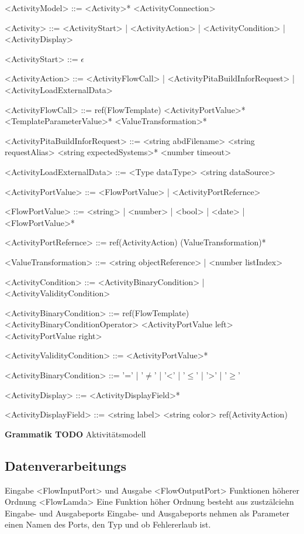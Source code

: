\documentclass{article}
\begin{document}
    \begin{grammar}
        <ActivityModel> ::= <Activity>* <ActivityConnection>

        <Activity> ::= <ActivityStart>
        | <ActivityAction>
        | <ActivityCondition>
        | <ActivityDisplay>

        <ActivityStart> ::= $\epsilon$

        <ActivityAction> ::= <ActivityFlowCall>
        | <ActivityPitaBuildInforRequest>
        | <ActivityLoadExternalData>

        <ActivityFlowCall> ::= ref(FlowTemplate) <ActivityPortValue>* <TemplateParameterValue>* <ValueTransformation>*

        <ActivityPitaBuildInforRequest> ::= <string abdFilename> <string requestAlias> <string expectedSystems>* <number timeout>

        <ActivityLoadExternalData> ::= <Type dataType> <string dataSource>

        <ActivityPortValue> ::= <FlowPortValue>
        | <ActivityPortRefernce>

        <FlowPortValue> ::= <string>
        | <number>
        | <bool>
        | <date>
        | <FlowPortValue>*

        <ActivityPortRefernce> ::= ref(ActivityAction) (ValueTransformation)*

        <ValueTransformation> ::= <string objectReference>
        | <number listIndex>

        <ActivityCondition> ::= <ActivityBinaryCondition>
        | <ActivityValidityCondition>

        <ActivityBinaryCondition> ::= ref(FlowTemplate) <ActivityBinaryConditionOperator> <ActivityPortValue left> <ActivityPortValue right>

        <ActivityValidityCondition> ::= <ActivityPortValue>*

        <ActivityBinaryCondition> ::= '='
        | '$\neq$' 
        | '\textless' 
        | '$\leq$' 
        | '\textgreater' 
        | '$\geq$'

        <ActivityDisplay> ::= <ActivityDisplayField>*

        <ActivityDisplayField> ::= <string label> <string color> ref(ActivityAction)
    \end{grammar}
    \textbf{Grammatik TODO} Aktivitätsmodell
    \newpage
    \subsection{Datenverarbeitungs}
    Eingabe <FlowInputPort> und Ausgabe <FlowOutputPort>
    Funktionen höherer Ordnung <FlowLamda>
    Eine Funktion höher Ordnung besteht aus zustzälciehn Eingabe- und Ausgabeports
    Eingabe- und Ausgabeports nehmen als Parameter einen Namen des Ports, den Typ und ob Fehlererlaub ist.
\end{document}
